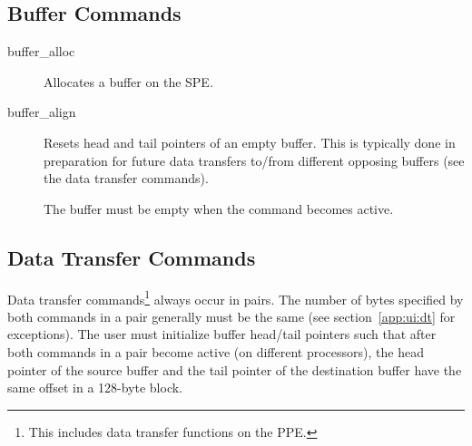 \subsection{Buffer Commands}

\begin{description}
\item[\textsf{buffer\_alloc}] Allocates a buffer on the SPE.

\item[\textsf{buffer\_align}] Resets head and tail pointers of an empty buffer. This is typically done in preparation for future data transfers to/from different opposing buffers (see the data transfer commands).

The buffer must be empty when the command becomes active.

\end{description}

\subsection{Data Transfer Commands}

Data transfer commands\footnote{This includes data transfer functions on the PPE.} always occur in pairs. The number of bytes specified by both commands in a pair generally must be the same (see section~\ref{app:ui:dt} for exceptions). The user must initialize buffer head/tail pointers such that after both commands in a pair become active (on different processors), the head pointer of the source buffer and the tail pointer of the destination buffer have the same offset in a 128-byte block.

